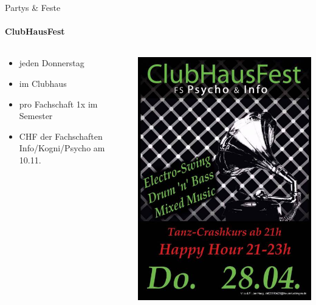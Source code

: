 \documentclass{beamer}
\begin{document}
	\begin{frame}{Partys \& Feste}
		\framesubtitle{ClubHausFest}
		\begin{columns}
			\begin{column}{.5\linewidth}
				\begin{itemize}
					\item jeden Donnerstag
					\item im Clubhaus 
					\item pro Fachschaft 1x im Semester
					\item CHF der Fachschaften Info/Kogni/Psycho am 10.11.
				\end{itemize}
			\end{column}
			\begin{column}{.5\linewidth}
				\includegraphics[width=\linewidth]{pictures/chf.jpg}
			\end{column}
		\end{columns}
	\end{frame}
\end{document}
